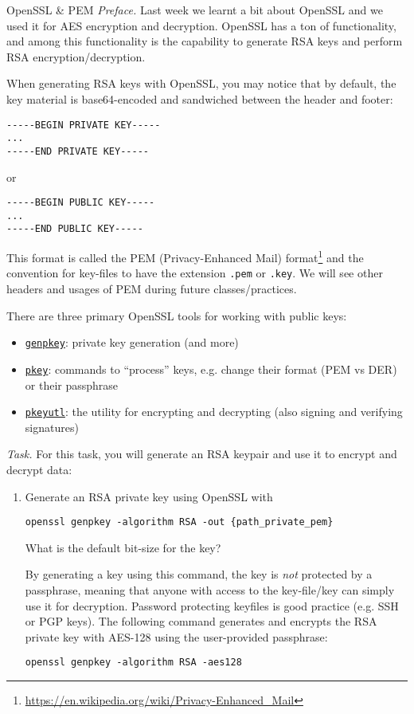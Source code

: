 \documentclass{practice}
\begin{document}
\begin{task}{OpenSSL \& PEM}
  \textit{Preface.}
  Last week we learnt a bit about OpenSSL and we used it for AES encryption and decryption.
  OpenSSL has a ton of functionality, and among this functionality is the capability to generate RSA keys and perform RSA encryption/decryption.

  When generating RSA keys with OpenSSL, you may notice that by default, the key material is base64-encoded and sandwiched between the header and footer:
  \begin{Verbatim}
-----BEGIN PRIVATE KEY-----
...
-----END PRIVATE KEY-----
  \end{Verbatim}
  or
  \begin{Verbatim}
-----BEGIN PUBLIC KEY-----
...
-----END PUBLIC KEY-----
  \end{Verbatim}
  This format is called the PEM (Privacy-Enhanced Mail) format\footnote{\url{https://en.wikipedia.org/wiki/Privacy-Enhanced_Mail}} and the convention for key-files to have the extension \texttt{.pem} or \texttt{.key}.
  We will see other headers and usages of PEM during future classes/practices.

  There are three primary OpenSSL tools for working with public keys:
  \begin{itemize}
    \item \href{https://docs.openssl.org/master/man1/openssl-genpkey/}{\texttt{genpkey}}: private key generation (and more)
    \item \href{https://docs.openssl.org/master/man1/openssl-pkey/}{\texttt{pkey}}: commands to \enquote{process} keys, e.g. change their format (PEM vs DER) or their passphrase
    \item \href{https://docs.openssl.org/master/man1/openssl-pkeyutl/}{\texttt{pkeyutl}}: the utility for encrypting and decrypting (also signing and verifying signatures)
  \end{itemize}

  \textit{Task.}
  For this task, you will generate an RSA keypair and use it to encrypt and decrypt data:
  \begin{enumerate}
    \item Generate an RSA private key using OpenSSL with
    \begin{Verbatim}
openssl genpkey -algorithm RSA -out {path_private_pem}
    \end{Verbatim}
    What is the default bit-size for the key?

    \begin{tcolorbox}[title=Warning]
      By generating a key using this command, the key is \emph{not} protected by a passphrase, meaning that anyone with access to the key-file/key can simply use it for decryption.
      \tcblower
      Password protecting keyfiles is good practice (e.g. SSH or PGP keys).
      The following command generates and encrypts the RSA private key with AES-128 using the user-provided passphrase:
      \begin{Verbatim}
openssl genpkey -algorithm RSA -aes128
      \end{Verbatim}
    \end{tcolorbox}


\end{enumerate}
\end{task}
\end{document}
